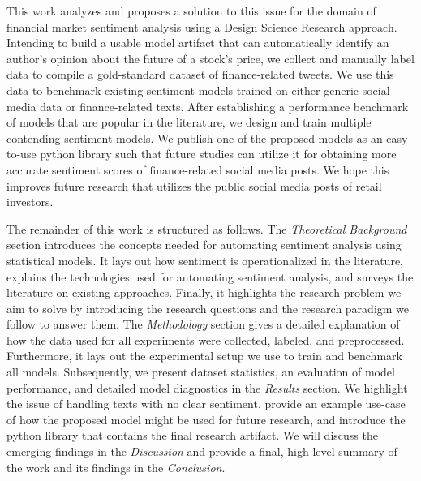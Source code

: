 This work analyzes and proposes a solution to this issue for the domain of financial market sentiment analysis using a Design Science Research approach. Intending to build a usable model artifact that can automatically identify an author's opinion about the future of a stock's price, we collect and manually label data to compile a gold-standard dataset of finance-related tweets. We use this data to benchmark existing sentiment models trained on either generic social media data or finance-related texts. After establishing a performance benchmark of models that are popular in the literature, we design and train multiple contending sentiment models. We publish one of the proposed models as an easy-to-use python library such that future studies can utilize it for obtaining more accurate sentiment scores of finance-related social media posts. We hope this improves future research that utilizes the public social media posts of retail investors.

The remainder of this work is structured as follows. The \emph{Theoretical Background} section introduces the concepts needed for automating sentiment analysis using statistical models. It lays out how sentiment is operationalized in the literature, explains the technologies used for automating sentiment analysis, and surveys the literature on existing approaches. Finally, it highlights the research problem we aim to solve by introducing the research questions and the research paradigm we follow to answer them. The \emph{Methodology} section gives a detailed explanation of how the data used for all experiments were collected, labeled, and preprocessed. Furthermore, it lays out the experimental setup we use to train and benchmark all models. Subsequently, we present dataset statistics, an evaluation of model performance, and detailed model diagnostics in the \emph{Results} section. We highlight the issue of handling texts with no clear sentiment, provide an example use-case of how the proposed model might be used for future research, and introduce the python library that contains the final research artifact. We will discuss the emerging findings in the \emph{Discussion} and provide a final, high-level summary of the work and its findings in the \emph{Conclusion}.